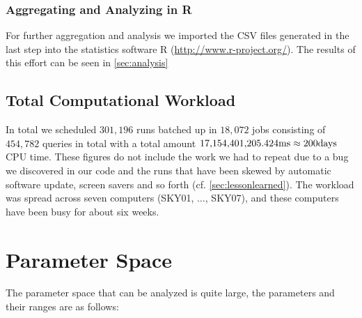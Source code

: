 \subsubsection{Aggregating and Analyzing in R}
\label{sec:aggregatingandanalyzing}
For further aggregation and analysis we imported the CSV files
generated in the last step into the statistics software R
(\url{http://www.r-project.org/}). The results of this effort can be
seen in \autoref{sec:analysis}


\subsection{Total Computational Workload}
\label{sec:totalworkload}
In total we scheduled $301{,}196$ runs batched up in $18{,}072$ jobs
consisting of $454{,}782$ queries in total with a total amount
$17{,}154{,}401{,}205.424\textnormal{ms}
\approx 200\textnormal{days}$ CPU time.  These figures do not include
the work we had to repeat due to a bug we discovered in our code and
the runs that have been skewed by automatic software update, screen
savers and so forth (cf. \autoref{sec:lessonlearned}).  The
workload was spread across seven computers (SKY01, $\ldots$, SKY07),
and these computers have been busy for about six weeks.

\section{Parameter Space}
The parameter space that can be analyzed is quite large, the
parameters and their ranges are as follows:

